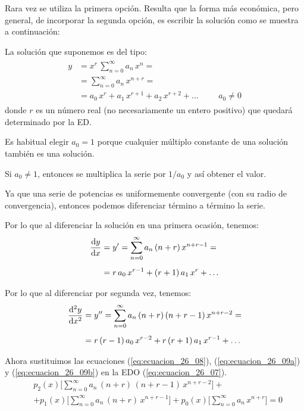 Rara vez se utiliza la primera opción. Resulta que la forma más económica, pero general, de incorporar la segunda opción, es escribir la solución como se muestra a continuación:
\par
La solución que suponemos es del tipo:
\begin{align}
\begin{aligned}
y &= x^{r} \, \sum_{n=0}^{\infty} a_{n} \, x^{n} = \\[0.5em] 
&= \sum_{n=0}^{\infty} a_{n} \, x^{n+r} = \\[0.5em] 
&= a_{0} \, x^{r} + a_{1} \, x^{r+1} + a_{2} \, x^{r+2} + \ldots \hspace{1cm} a_{0} \neq 0
\end{aligned}
\label{eq:ecuacion_26_08}    
\end{align}
donde $r$ es un número real (no necesariamente un entero positivo) que quedará determinado por la ED.
\par
Es habitual elegir $a_{0} = 1$ porque cualquier múltiplo constante de una solución también es una solución.
\par
Si $a_{0} \neq 1$, entonces se multiplica la serie por $1/a_{0}$ y así obtener el valor.
\par
Ya que una serie de potencias es uniformemente convergente (con su radio de convergencia), entonces podemos diferenciar término a término la serie.
\par
Por lo que al diferenciar la solución en una primera ocasión, tenemos:
\begin{align}
\begin{aligned}
\dv{y}{x} &= {y}^{\prime} = \sum_{n=0}^{\infty} a_{n} \, (n + r) \, x^{n+r-1} = \\[0.5em] 
&= r \, a_{0} \, x^{r-1} + (r + 1) \, a_{1} \, x^{r} + \ldots
\end{aligned}
\label{eq:ecuacion_26_09a}
\end{align}

Por lo que al diferenciar por segunda vez, tenemos:
\begin{align}
\begin{aligned}
\dv[2]{y}{x} &= {y}^{\prime \prime} =  \sum_{n=0}^{\infty} a_{n} \, (n + r) \, (n + r - 1) \, x^{n+r-2} = \\[0.5em] 
&= r \, (r - 1) \, a_{0} \, x^{r-2} + r \, (r + 1) \, a_{1} \, x^{r-1} + \ldots
\end{aligned}
\label{eq:ecuacion_26_09b}
\end{align}

Ahora sustituimos las ecuaciones (\ref{eq:ecuacion_26_08}), (\ref{eq:ecuacion_26_09a}) y (\ref{eq:ecuacion_26_09b}) en la EDO (\ref{eq:ecuacion_26_07}).
\begin{align*}
&p_{2}(x) \bigg[ \sum_{n=0}^{\infty} a_{n} \, (n + r) \, (n + r - 1) \, x^{n+r-2} \bigg] + \\[1em]
&+ p_{1} (x) \bigg[ \sum_{n=0}^{\infty} a_{n} \, (n + r) \, x^{n+r-1} \bigg] + p_{0}(x) \bigg[ \sum_{n=0}^{\infty} a_{n} \, x^{n+r} \bigg] = 0
\end{align*}


